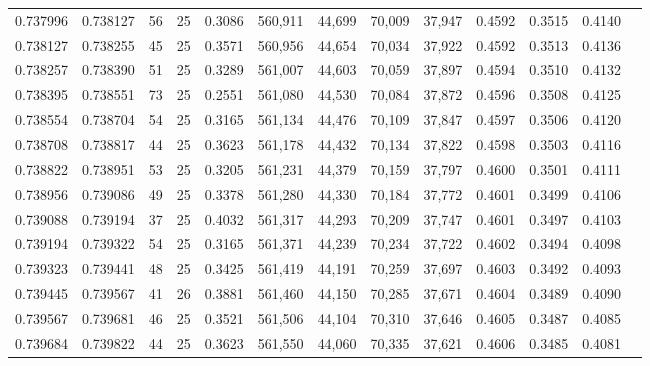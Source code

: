 \begin{tabular}{rrrrrrrrrrrrr}
0.737996 & 0.738127 &    56 &  25 &                                     0.3086 & 560,911 &  44,699 &  70,009 &  37,947 & 0.4592 & 0.3515 & 0.4140 \\
0.738127 & 0.738255 &    45 &  25 &                                     0.3571 & 560,956 &  44,654 &  70,034 &  37,922 & 0.4592 & 0.3513 & 0.4136 \\
0.738257 & 0.738390 &    51 &  25 &                                     0.3289 & 561,007 &  44,603 &  70,059 &  37,897 & 0.4594 & 0.3510 & 0.4132 \\
0.738395 & 0.738551 &    73 &  25 &                                     0.2551 & 561,080 &  44,530 &  70,084 &  37,872 & 0.4596 & 0.3508 & 0.4125 \\
0.738554 & 0.738704 &    54 &  25 &                                     0.3165 & 561,134 &  44,476 &  70,109 &  37,847 & 0.4597 & 0.3506 & 0.4120 \\
0.738708 & 0.738817 &    44 &  25 &                                     0.3623 & 561,178 &  44,432 &  70,134 &  37,822 & 0.4598 & 0.3503 & 0.4116 \\
0.738822 & 0.738951 &    53 &  25 &                                     0.3205 & 561,231 &  44,379 &  70,159 &  37,797 & 0.4600 & 0.3501 & 0.4111 \\
0.738956 & 0.739086 &    49 &  25 &                                     0.3378 & 561,280 &  44,330 &  70,184 &  37,772 & 0.4601 & 0.3499 & 0.4106 \\
0.739088 & 0.739194 &    37 &  25 &                                     0.4032 & 561,317 &  44,293 &  70,209 &  37,747 & 0.4601 & 0.3497 & 0.4103 \\
0.739194 & 0.739322 &    54 &  25 &                                     0.3165 & 561,371 &  44,239 &  70,234 &  37,722 & 0.4602 & 0.3494 & 0.4098 \\
0.739323 & 0.739441 &    48 &  25 &                                     0.3425 & 561,419 &  44,191 &  70,259 &  37,697 & 0.4603 & 0.3492 & 0.4093 \\
0.739445 & 0.739567 &    41 &  26 &                                     0.3881 & 561,460 &  44,150 &  70,285 &  37,671 & 0.4604 & 0.3489 & 0.4090 \\
0.739567 & 0.739681 &    46 &  25 &                                     0.3521 & 561,506 &  44,104 &  70,310 &  37,646 & 0.4605 & 0.3487 & 0.4085 \\
0.739684 & 0.739822 &    44 &  25 &                                     0.3623 & 561,550 &  44,060 &  70,335 &  37,621 & 0.4606 & 0.3485 & 0.4081 \\

\end{tabular}
